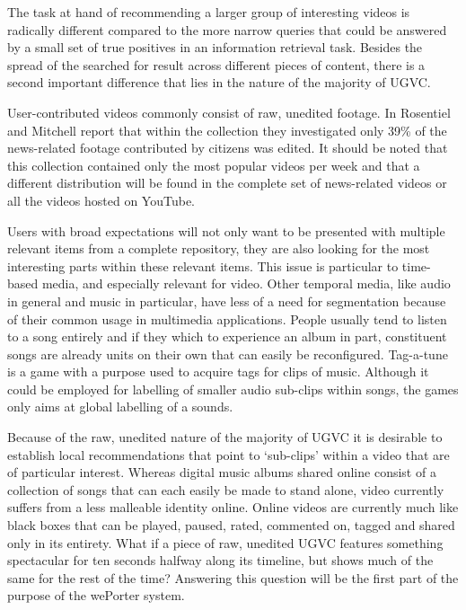 The task at hand of recommending a larger group of interesting videos is radically different compared to the more narrow queries that could be answered by a small set of true positives in an information retrieval task. Besides the spread of the searched for result across different pieces of content, there is a second important difference that lies in the nature of the majority of UGVC.

User-contributed videos commonly consist of raw, unedited footage. In \cite{Rosenstiel:2012vb} Rosentiel and Mitchell report that within the collection they investigated only 39\% of the news-related footage contributed by citizens was edited. It should be noted that this collection contained only the most popular videos per week and that a different distribution will be found in the complete set of news-related videos or all the videos hosted on YouTube. 

Users with broad expectations will not only want to be presented with multiple relevant items from a complete repository, they are also looking for the most interesting parts within these relevant items. This issue is particular to time-based media, and especially relevant for video. Other temporal media, like audio in general and music in particular, have less of a need for segmentation because of  their common usage in multimedia applications. People usually tend to listen to a song entirely and if they which to experience an album in part, constituent songs are already units on their own that can easily be reconfigured. Tag-a-tune is a game with a purpose used to acquire tags for clips of music. Although it could be employed for labelling of smaller audio sub-clips within songs, the games only aims at global labelling of a sounds\cite{Law:2009vl}.

Because of the raw, unedited nature of the majority of UGVC it is desirable to establish local recommendations that point to `sub-clips' within a video that are of particular interest. Whereas digital music albums shared online consist of a collection of songs that can each easily be made to stand alone, video currently suffers from a less malleable identity online.  Online videos are currently much like black boxes that can be played, paused, rated, commented on, tagged and shared only in its entirety. What if a piece of raw, unedited UGVC features something spectacular for ten seconds halfway along its timeline, but shows much of the same for the rest of the time? Answering this question will be the first part of the purpose of the wePorter system.

